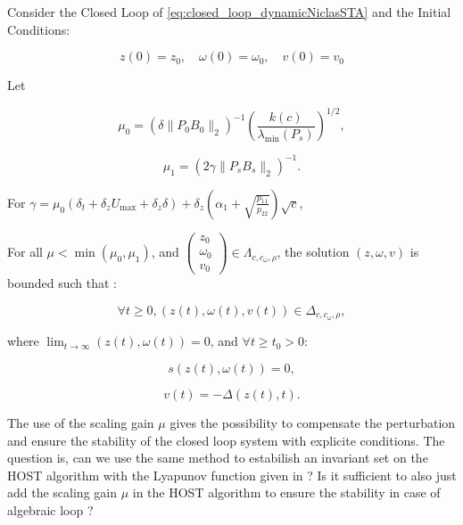\begin{theorem}
    Consider the Closed Loop of \ref{eq:closed_loop_dynamicNiclasSTA} and the Initial Conditions:

    \begin{equation} 
        z(0) = z_0, \quad \omega(0) = \omega_0, \quad v(0) = v_0 
    \end{equation}

    Let

    \begin{equation}
        \mu_0 = (\delta \|P_0 B_0\|_2)^{-1} \left( \frac{k(c)}{\lambda_{\min}(P_s)} \right)^{1/2},
    \end{equation}

    \begin{equation}
        \mu_1 = (2\gamma \|P_s B_s\|_2)^{-1}.
    \end{equation}

    For \(\gamma = \mu_0 (\delta_t + \delta_z U_{\max} + \delta_z \delta) + \delta_z (\alpha_1 + \sqrt{\frac{p_{11}}{p_{22}}})\sqrt{c}\),
    
    For all \(\mu < \min(\mu_0, \mu_1)\), and \(\begin{pmatrix} z_0 \\ \omega_0 \\ v_0 \end{pmatrix} \in \Lambda_{c, c_\omega, \rho}\), 
    the solution \((z, \omega, v)\) is bounded such that :

    \begin{equation}
        \forall t \geq 0, (z(t), \omega(t), v(t)) \in \Delta_{c, c_\omega, \rho},
    \end{equation}

    where \(\lim_{t \to \infty} (z(t), \omega(t)) = 0\), and \(\forall t \geq t_0 > 0\):
    
    \begin{equation}
        s(z(t), \omega(t)) = 0,
    \end{equation}
    
    \begin{equation}
        v(t) = -\Delta(z(t), t).
    \end{equation}
\end{theorem}


The use of the scaling gain \(\mu\) gives the possibility to compensate the perturbation and ensure the 
stability of the closed loop system with explicite conditions. The question is, can we use the same method 
to estabilish an invariant set on the HOST algorithm with the Lyapunov function given in \cite{Laghrouche2017} ?
Is it sufficient to also just add the scaling gain \(\mu\) in the HOST algorithm to ensure the stability in 
case of algebraic loop ?



